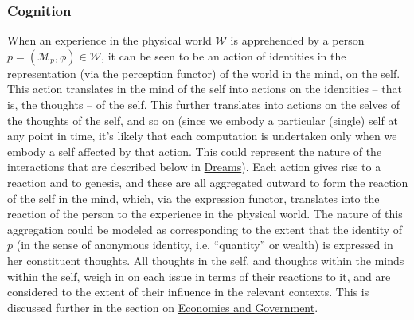 \documentclass[pra,twocolumn,groupedaddress,10pt]{revtex4}
\theoremstyle{definition}
\begin{document}
\subsubsection{Cognition} \label{sec:cognition}

When an experience in the physical world $\mathcal{W}$ is apprehended by a person $p = (\mathcal{M}_{p}, \phi) \in \mathcal{W}$, it can be seen to be an action of identities in the representation (via the perception functor) of the world in the mind, on the self. This action translates in the mind of the self into actions on the identities -- that is, the thoughts -- of the self. This further translates into actions on the selves of the thoughts of the self, and so on (since we embody a particular (single) self at any point in time, it's likely that each computation is undertaken only when we embody a self affected by that action. This could represent the nature of the interactions that are described below in \hyperref[sec:dreams]{Dreams}). Each action gives rise to a reaction and to genesis, and these are all aggregated outward to form the reaction of the self in the mind, which, via the expression functor, translates into the reaction of the person to the experience in the physical world. The nature of this aggregation could be modeled as corresponding to the extent that the identity of $p$ (in the sense of anonymous identity, i.e. ``quantity'' or wealth) is expressed in her constituent thoughts. All thoughts in the self, and thoughts within the minds within the self, weigh in on each issue in terms of their reactions to it, and are considered to the extent of their influence in the relevant contexts. This is discussed further in the section on \hyperref[sec:ecogovintpro]{Economies and Government}.
\end{document}
